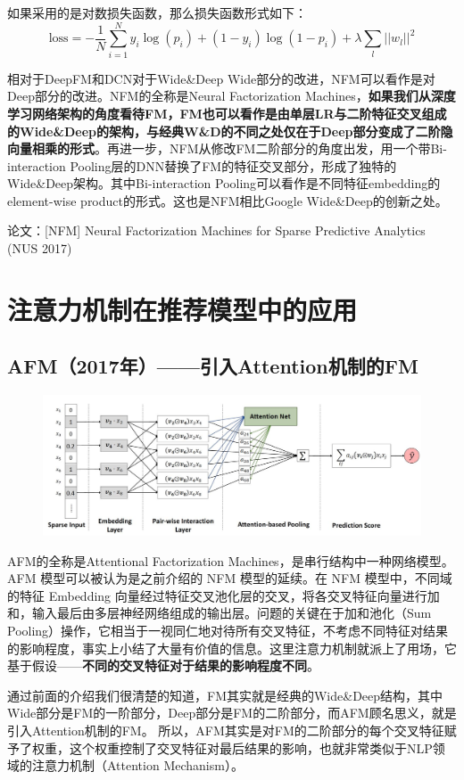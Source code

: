 \documentclass[12pt]{article}
\begin{document}
如果采用的是对数损失函数，那么损失函数形式如下：
$$
\text{loss} = -\frac{1}{N} \sum_{i=1}^Ny_i\log(p_i) + (1-y_i)\log(1-p_i) + \lambda\sum_l||w_l||^2
$$


相对于DeepFM和DCN对于Wide\&Deep Wide部分的改进，NFM可以看作是对Deep部分的改进。NFM的全称是Neural Factorization Machines，\textbf{如果我们从深度学习网络架构的角度看待FM，FM也可以看作是由单层LR与二阶特征交叉组成的Wide\&Deep的架构，与经典W\&D的不同之处仅在于Deep部分变成了二阶隐向量相乘的形式}。再进一步，NFM从修改FM二阶部分的角度出发，用一个带Bi-interaction Pooling层的DNN替换了FM的特征交叉部分，形成了独特的Wide\&Deep架构。其中Bi-interaction Pooling可以看作是不同特征embedding的element-wise product的形式。这也是NFM相比Google Wide\&Deep的创新之处。

论文：[NFM] Neural Factorization Machines for Sparse Predictive Analytics (NUS 2017)

\section{注意力机制在推荐模型中的应用}
\subsection{AFM（2017年）——引入Attention机制的FM}
\begin{figure}[H]
    \centering
    \includegraphics[width=.8\textwidth]{fig/AFM_Structure.jpg}
\end{figure}

AFM的全称是Attentional Factorization Machines，是串行结构中一种网络模型。AFM 模型可以被认为是之前介绍的 NFM 模型的延续。在 NFM 模型中，不同域的特征 Embedding 向量经过特征交叉池化层的交叉，将各交叉特征向量进行加和，输入最后由多层神经网络组成的输出层。问题的关键在于加和池化（Sum Pooling）操作，它相当于一视同仁地对待所有交叉特征，不考虑不同特征对结果的影响程度，事实上小结了大量有价值的信息。这里注意力机制就派上了用场，它基于假设——\textbf{不同的交叉特征对于结果的影响程度不同}。

通过前面的介绍我们很清楚的知道，FM其实就是经典的Wide\&Deep结构，其中Wide部分是FM的一阶部分，Deep部分是FM的二阶部分，而AFM顾名思义，就是引入Attention机制的FM。
所以，AFM其实是对FM的二阶部分的每个交叉特征赋予了权重，这个权重控制了交叉特征对最后结果的影响，也就非常类似于NLP领域的注意力机制（Attention Mechanism）。
\end{document}
